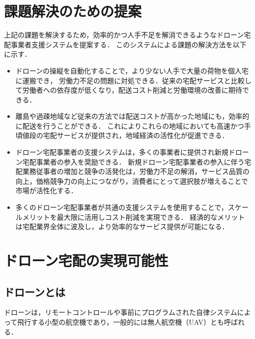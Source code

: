 \documentclass[a4paper, titlepage]{jsarticle}
\begin{document}
\section{課題解決のための提案}
上記の課題を解決するため，効率的かつ人手不足を解消できるようなドローン宅配事業者支援システムを提案する．
このシステムによる課題の解決方法を以下に示す．
\begin{itemize}
\item ドローンの操縦を自動化することで，より少ない人手で大量の荷物を個人宅に運搬でき，
  労働力不足の問題に対処できる．従来の宅配サービスと比較して労働者への依存度が低くなり，配送コスト削減と労働環境の改善に期待できる．

\item 離島や過疎地域など従来の方法では配送コストが高かった地域にも，効率的に配送を行うことができる．
  これによりこれらの地域においても高速かつ手頃値段の宅配サービスが提供され，地域経済の活性化が促進できる．

\item ドローン宅配事業者の支援システムは，多くの事業者に提供され新規ドローン宅配事業者の参入を奨励できる．
  新規ドローン宅配事業者の参入に伴う宅配業務従事者の増加と競争の活発化は，労働力不足の解消，サービス品質の向上，価格競争力の向上につながり，消費者にとって選択肢が増えることで市場が活性化する．

\item 多くのドローン宅配事業者が共通の支援システムを使用することで，スケールメリットを最大限に活用しコスト削減を実現できる．
  経済的なメリットは宅配業界全体に波及し，より効率的なサービス提供が可能になる．


\end{itemize}

\section{ドローン宅配の実現可能性}
\subsection{ドローンとは}
ドローンは，リモートコントロールや事前にプログラムされた自律システムによって飛行する小型の航空機であり，一般的には無人航空機（UAV）とも呼ばれる．
\end{document}
